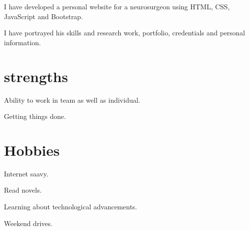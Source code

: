 \documentclass[]{deedy-resume-openfont}
\begin{document}
\begin{minipage}[t]{0.66\textwidth}


\begin{tightemize}
\item I have developed a personal website for a neurosurgeon using HTML, CSS, JavaScript and Bootstrap. 
\item I have portrayed his skills and research work, portfolio, credentials and personal information.



\end{tightemize}


\section{}



\section{strengths} 
\sectionsep

\begin{tightemize}
\item Ability to work in team as well as individual.
\item Getting things done. 



\end{tightemize}
\sectionsep


\section{Hobbies} 
\sectionsep

\begin{tightemize}
\item Internet saavy.
\item Read novels.
\item Learning about technological advancements. 
\item Weekend drives. 



\end{tightemize}
\sectionsep

\end{minipage} 
\end{document}
